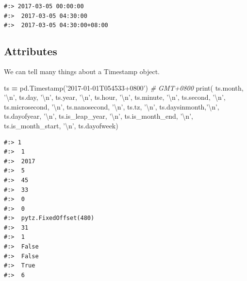 \documentclass[
]{book}
\newenvironment{Shaded}{\begin{snugshade}}{\end{snugshade}}
\newcommand{\BuiltInTok}[1]{#1}
\newcommand{\CharTok}[1]{\textcolor[rgb]{0.5,0.5,0.5}{#1}}
\newcommand{\CommentTok}[1]{\textcolor[rgb]{0.37,0.37,0.37}{\textit{#1}}}
\newcommand{\NormalTok}[1]{#1}
\newcommand{\OperatorTok}[1]{\textcolor[rgb]{0.43,0.43,0.43}{\textbf{#1}}}
\newcommand{\StringTok}[1]{\textcolor[rgb]{0.5,0.5,0.5}{#1}}
\begin{document}
\begin{verbatim}
#:> 2017-03-05 00:00:00 
#:>  2017-03-05 04:30:00 
#:>  2017-03-05 04:30:00+08:00
\end{verbatim}

\hypertarget{attributes-4}{%
\subsection{Attributes}\label{attributes-4}}

We can tell many things about a Timestamp object.

\begin{Shaded}
\begin{Highlighting}[]
\NormalTok{ts }\OperatorTok{=}\NormalTok{ pd.Timestamp(}\StringTok{'2017-01-01T054533+0800'}\NormalTok{) }\CommentTok{# GMT+0800}
\BuiltInTok{print}\NormalTok{( ts.month, }\StringTok{'}\CharTok{\textbackslash{}n}\StringTok{'}\NormalTok{,}
\NormalTok{       ts.day, }\StringTok{'}\CharTok{\textbackslash{}n}\StringTok{'}\NormalTok{,}
\NormalTok{       ts.year, }\StringTok{'}\CharTok{\textbackslash{}n}\StringTok{'}\NormalTok{,}
\NormalTok{       ts.hour, }\StringTok{'}\CharTok{\textbackslash{}n}\StringTok{'}\NormalTok{,}
\NormalTok{       ts.minute, }\StringTok{'}\CharTok{\textbackslash{}n}\StringTok{'}\NormalTok{,}
\NormalTok{       ts.second, }\StringTok{'}\CharTok{\textbackslash{}n}\StringTok{'}\NormalTok{,}
\NormalTok{       ts.microsecond, }\StringTok{'}\CharTok{\textbackslash{}n}\StringTok{'}\NormalTok{,}
\NormalTok{       ts.nanosecond, }\StringTok{'}\CharTok{\textbackslash{}n}\StringTok{'}\NormalTok{,}
\NormalTok{       ts.tz, }\StringTok{'}\CharTok{\textbackslash{}n}\StringTok{'}\NormalTok{,}
\NormalTok{       ts.daysinmonth,}\StringTok{'}\CharTok{\textbackslash{}n}\StringTok{'}\NormalTok{,}
\NormalTok{       ts.dayofyear, }\StringTok{'}\CharTok{\textbackslash{}n}\StringTok{'}\NormalTok{,}
\NormalTok{       ts.is_leap_year, }\StringTok{'}\CharTok{\textbackslash{}n}\StringTok{'}\NormalTok{,}
\NormalTok{       ts.is_month_end, }\StringTok{'}\CharTok{\textbackslash{}n}\StringTok{'}\NormalTok{,}
\NormalTok{       ts.is_month_start, }\StringTok{'}\CharTok{\textbackslash{}n}\StringTok{'}\NormalTok{,}
\NormalTok{       ts.dayofweek)}
\end{Highlighting}
\end{Shaded}

\begin{verbatim}
#:> 1 
#:>  1 
#:>  2017 
#:>  5 
#:>  45 
#:>  33 
#:>  0 
#:>  0 
#:>  pytz.FixedOffset(480) 
#:>  31 
#:>  1 
#:>  False 
#:>  False 
#:>  True 
#:>  6
\end{verbatim}
\end{document}
